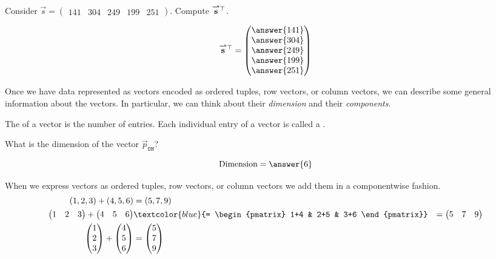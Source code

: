\documentclass{ximera}
\begin{document}
\begin{question}
  Consider $\vec{s} = \begin{pmatrix}141 & 304 & 249 & 199 & 251 \end{pmatrix}$. Compute ${\overset{\boldsymbol{\rightharpoonup}}{\mathbf{s}}}\hspace{0in}^\top$.
  \begin{prompt}
  \[
  \vec{s}^\transpose  = \begin{pmatrix}\answer{141} \\ \answer{304} \\ \answer{249} \\ \answer{199} \\ \answer{251} \end{pmatrix}
  \]
  \end{prompt}
\end{question}

Once we have data represented as vectors encoded as ordered tuples,
row vectors, or column vectors, we can describe some general
information about the vectors. In particular, we can think about their
\textit{dimension} and their \textit{components}.

\begin{definition}
The  of a vector is the number of entries. Each
individual entry of a vector is called a .
\end{definition}

\begin{question}
  What is the dimension of the vector $\vec{p}_{\texttt{OH}}$?
  \begin{prompt}
  \[
  \text{Dimension} = \answer{6}
  \]
  \end{prompt}
\end{question}


When we express vectors as ordered tuples, row vectors, or column
vectors we add them in a componentwise fashion.
\begin{align*}
  (1,2,3) + (4,5,6) &= (5,7,9)\\
  \begin{pmatrix} 1 & 2 & 3   \end{pmatrix} + \begin{pmatrix} 4 & 5 & 6   \end{pmatrix}& \textcolor{blue}{= \begin{pmatrix} 1+4 & 2+5 & 3+6   \end{pmatrix}}&= \begin{pmatrix} 5 & 7 & 9   \end{pmatrix}\\
  \begin{pmatrix} 1\\ 2\\ 3   \end{pmatrix} + \begin{pmatrix} 4\\ 5\\ 6   \end{pmatrix} &= \begin{pmatrix} 5\\ 7\\ 9   \end{pmatrix}
\end{align*}
\end{document}
